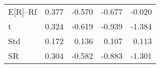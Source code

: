 \begin{tabular}{lrrrr}
\toprule
\midrule
E[R]--Rf & 0.377 & -0.570 & -0.677 & -0.020 \\
t & 0.324 & -0.619 & -0.939 & -1.384 \\
Std & 0.172 & 0.136 & 0.107 & 0.113 \\
SR & 0.304 & -0.582 & -0.883 & -1.301 \\
\bottomrule
\end{tabular}
